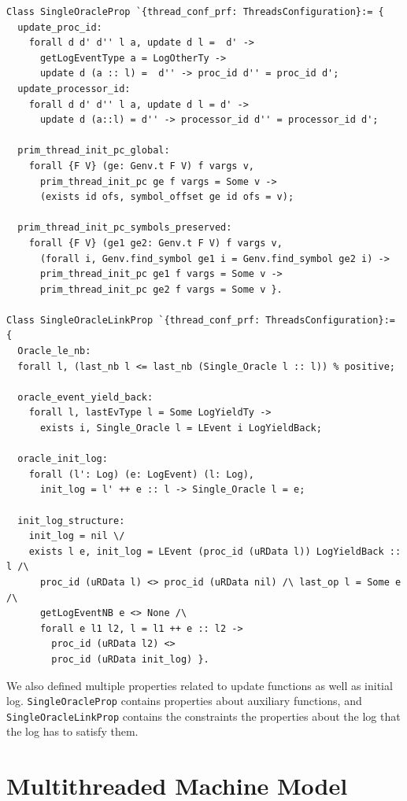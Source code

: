\begin{lstlisting}
Class SingleOracleProp `{thread_conf_prf: ThreadsConfiguration}:= {
  update_proc_id:
    forall d d' d'' l a, update d l =  d' ->
      getLogEventType a = LogOtherTy ->
      update d (a :: l) =  d'' -> proc_id d'' = proc_id d';
  update_processor_id:
    forall d d' d'' l a, update d l = d' -> 
      update d (a::l) = d'' -> processor_id d'' = processor_id d';
       
  prim_thread_init_pc_global:
    forall {F V} (ge: Genv.t F V) f vargs v,
      prim_thread_init_pc ge f vargs = Some v ->
      (exists id ofs, symbol_offset ge id ofs = v);

  prim_thread_init_pc_symbols_preserved:
    forall {F V} (ge1 ge2: Genv.t F V) f vargs v,
      (forall i, Genv.find_symbol ge1 i = Genv.find_symbol ge2 i) ->
      prim_thread_init_pc ge1 f vargs = Some v ->
      prim_thread_init_pc ge2 f vargs = Some v }.

Class SingleOracleLinkProp `{thread_conf_prf: ThreadsConfiguration}:= {
  Oracle_le_nb: 
  forall l, (last_nb l <= last_nb (Single_Oracle l :: l)) % positive;

  oracle_event_yield_back:
    forall l, lastEvType l = Some LogYieldTy ->
      exists i, Single_Oracle l = LEvent i LogYieldBack;

  oracle_init_log:
    forall (l': Log) (e: LogEvent) (l: Log),
      init_log = l' ++ e :: l -> Single_Oracle l = e;
      
  init_log_structure:
    init_log = nil \/
    exists l e, init_log = LEvent (proc_id (uRData l)) LogYieldBack :: l /\
      proc_id (uRData l) <> proc_id (uRData nil) /\ last_op l = Some e /\
      getLogEventNB e <> None /\
      forall e l1 l2, l = l1 ++ e :: l2 ->
        proc_id (uRData l2) <> 
        proc_id (uRData init_log) }.
\end{lstlisting}
We also defined multiple properties related to 
update functions as well as initial log. 
\lstinline$SingleOracleProp$ contains properties about auxiliary functions, 
and \lstinline$SingleOracleLinkProp$  contains the constraints
the properties about the log that 
the log has to  satisfy them. 


\section{Multithreaded Machine Model}
\label{chapter:linking:subsec:multithreaded-machine-model}

